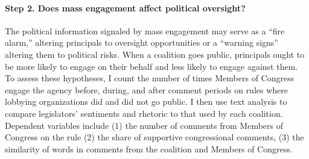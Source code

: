 \paragraph{Step 2. Does mass engagement affect political oversight?} The political information signaled by mass engagement may serve as a ``fire alarm,'' altering principals to oversight opportunities or a ``warning signs'' altering them to political risks.
When a coalition goes public, %
principals ought to be more likely to engage on their behalf and less likely to engage against them.
To assess these hypotheses, I count the number of times Members of Congress engage the agency before, during, and after comment periods on rules where lobbying organizations did and did not go public. I then use text analysis to compare legislators' sentiments and rhetoric to that used by each coalition.
Dependent variables include 
(1) the number of comments from Members of Congress on the rule %
(2) the share of supportive congressional comments, %
(3) the similarity of words in comments from the coalition and Members of Congress. 


